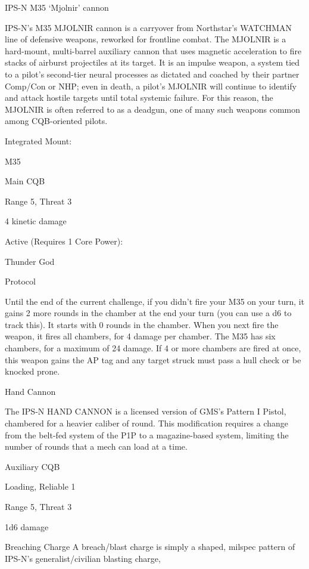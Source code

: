                                            IPS-N M35 ‘Mjolnir’ cannon

  IPS-N’s M35 MJOLNIR cannon is a carryover from Northstar’s WATCHMAN line of defensive weapons,
  reworked for frontline combat. The MJOLNIR is a hard-mount, multi-barrel auxiliary cannon that uses
  magnetic acceleration to fire stacks of airburst projectiles at its target. It is an impulse weapon, a system
  tied to a pilot’s second-tier neural processes as dictated and coached by their partner Comp/Con or
  NHP; even in death, a pilot’s MJOLNIR will continue to identify and attack hostile targets until total
  systemic failure. For this reason, the MJOLNIR is often referred to as a deadgun, one of many such
  weapons common among CQB-oriented pilots.

  Integrated Mount:

  M35

  Main CQB

  Range 5, Threat 3

  4 kinetic damage


  Active (Requires 1 Core Power):

  Thunder God

  Protocol

  Until the end of the current challenge, if you didn’t fire your M35 on your turn, it gains 2 more rounds in
  the chamber at the end your turn (you can use a d6 to track this). It starts with 0 rounds in the chamber.
  When you next fire the weapon, it fires all chambers, for 4 damage per chamber. The M35 has six
  chambers, for a maximum of 24 damage. If 4 or more chambers are fired at once, this weapon gains
  the AP tag and any target struck must pass a hull check or be knocked prone.

Hand Cannon




The IPS-N HAND CANNON is a licensed version of GMS’s Pattern I Pistol, chambered for a heavier caliber
of round. This modification requires a change from the belt-fed system of the P1P to a magazine-based
system, limiting the number of rounds that a mech can load at a time.

Auxiliary CQB

Loading, Reliable 1

Range 5, Threat 3

1d6 damage


Breaching Charge
A breach/blast charge is simply a shaped, milspec pattern of IPS-N’s generalist/civilian blasting charge,

